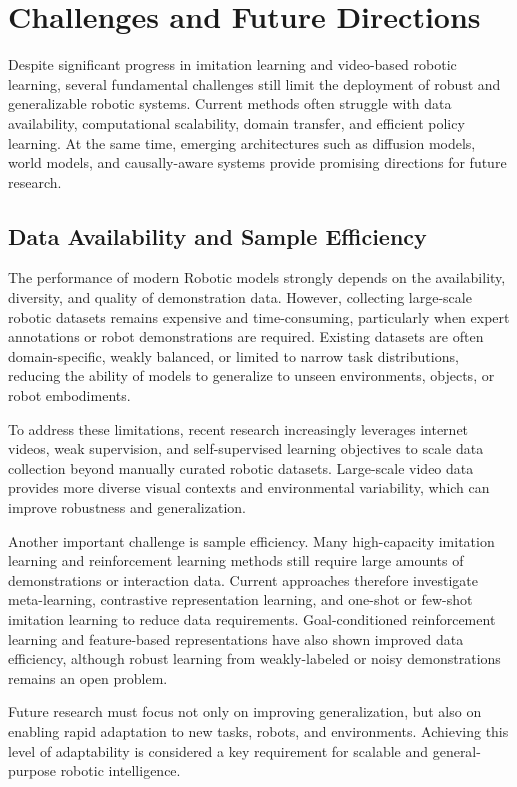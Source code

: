 \chapter{Challenges and Future Directions}

Despite significant progress in imitation learning and video-based robotic learning, several fundamental challenges still limit the deployment of robust and generalizable robotic systems. Current methods often struggle with data availability, computational scalability, domain transfer, and efficient policy learning. At the same time, emerging architectures such as diffusion models, world models, and causally-aware systems provide promising directions for future research.

\section{Data Availability and Sample Efficiency}

The performance of modern Robotic models strongly depends on the availability, diversity, and quality of demonstration data. However, collecting large-scale robotic datasets remains expensive and time-consuming, particularly when expert annotations or robot demonstrations are required. Existing datasets are often domain-specific, weakly balanced, or limited to narrow task distributions, reducing the ability of models to generalize to unseen environments, objects, or robot embodiments.

To address these limitations, recent research increasingly leverages internet videos, weak supervision, and self-supervised learning objectives to scale data collection beyond manually curated robotic datasets. Large-scale video data provides more diverse visual contexts and environmental variability, which can improve robustness and generalization.

Another important challenge is sample efficiency. Many high-capacity imitation learning and reinforcement learning methods still require large amounts of demonstrations or interaction data. Current approaches therefore investigate meta-learning, contrastive representation learning, and one-shot or few-shot imitation learning to reduce data requirements. Goal-conditioned reinforcement learning and feature-based representations have also shown improved data efficiency, although robust learning from weakly-labeled or noisy demonstrations remains an open problem.

Future research must focus not only on improving generalization, but also on enabling rapid adaptation to new tasks, robots, and environments. Achieving this level of adaptability is considered a key requirement for scalable and general-purpose robotic intelligence.

